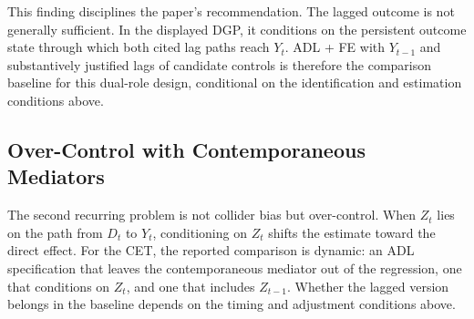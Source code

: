 \documentclass[
]{article}
\begin{document}


This finding disciplines the paper's recommendation. The lagged outcome
is not generally sufficient. In the displayed DGP, it conditions on the
persistent outcome state through which both cited lag paths reach
\(Y_t\). ADL + FE with \(Y_{t-1}\) and substantively justified lags of
candidate controls is therefore the comparison baseline for this
dual-role design, conditional on the identification and estimation
conditions above.

\subsection{Over-Control with Contemporaneous
Mediators}\label{over-control-with-contemporaneous-mediators}

The second recurring problem is not collider bias but over-control. When
\(Z_t\) lies on the path from \(D_t\) to \(Y_t\), conditioning on
\(Z_t\) shifts the estimate toward the direct effect. For the CET, the
reported comparison is dynamic: an ADL specification that leaves the
contemporaneous mediator out of the regression, one that conditions on
\(Z_t\), and one that includes \(Z_{t-1}\). Whether the lagged version
belongs in the baseline depends on the timing and adjustment conditions
above.

\begin{table}[!h]
\centering
\caption{\label{tab:overcontrol-table}Over-control simulations for the CET. In both the pure-mediator and mediator-plus-confounder designs, the displayed ADL specification with contemporaneous $Z_t$ produces a coefficient near the direct-effect target, whereas the displayed specification with $Z_{t-1}$ produces a coefficient near the total-effect target. These are design-specific comparisons. \label{tab:overcontrol_pa}}
\centering
{}
\end{table}
\end{document}
